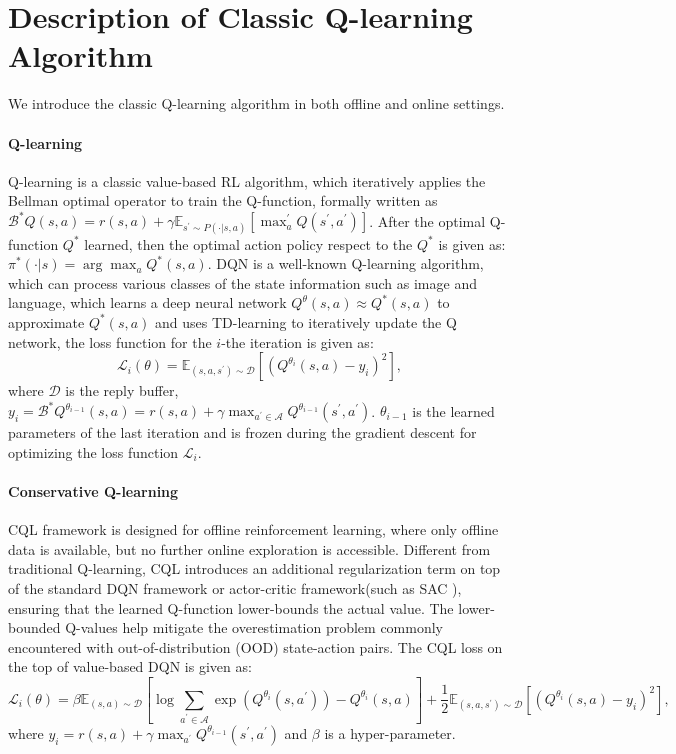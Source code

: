 \section{Description of Classic Q-learning Algorithm}
We introduce the classic Q-learning algorithm in both offline and online settings.
\paragraph{Q-learning}
Q-learning is a classic value-based RL algorithm, which iteratively applies the Bellman optimal operator to train the Q-function, formally written as $\mathcal{B}^*Q(s,a)=r(s,a)+\gamma \mathbb{E}_{s^\prime\sim P(\cdot|s,a)}\left[\max_a^\prime Q(s^\prime,a^\prime)\right]$. After the optimal Q-function $Q^*$ learned, then the optimal action policy respect to the $Q^*$ is given as: $\pi^*(\cdot|s)=\arg\max_a Q^*(s,a)$. DQN \citep{mnih2013playing} is a well-known Q-learning algorithm, which can process various classes of the state information such as image and language, which learns a deep neural network $Q^\theta(s,a)\approx Q^*(s,a)$ to approximate $Q^*(s,a)$ and uses TD-learning to iteratively update the Q network, the loss function for the $i$-the iteration is given as: 
\begin{equation}
\mathcal{L}_i(\theta)=\mathbb{E}_{(s,a,s^\prime)\sim \mathcal{D}}\left[(Q^{\theta_i}(s,a)-y_i)^2\right],
\end{equation}
where $\mathcal{D}$ is the reply buffer, $y_i=\mathcal{B}^*Q^{\theta_{i-1}}(s,a)=r(s,a)+\gamma \max_{a^\prime\in \mathcal{A}} Q^{\theta_{i-1}}(s^\prime,a^\prime)$. $\theta_{i-1}$ is the learned parameters of the last iteration and is frozen during the gradient descent for optimizing the loss function $\mathcal{L}_i$.
\paragraph{Conservative Q-learning}
CQL \citep{kumar2020conservative} framework is designed for offline reinforcement learning, where only offline data is available, but no further online exploration is accessible. Different from traditional Q-learning, CQL introduces an additional regularization term on top of the standard DQN framework or actor-critic framework(such as SAC \citep{haarnoja2018soft}), ensuring that the learned Q-function lower-bounds the actual value. The lower-bounded Q-values help mitigate the overestimation problem commonly encountered with out-of-distribution (OOD) state-action pairs. The CQL loss on the top of value-based DQN is given as:
\begin{equation}
\mathcal{L}_i(\theta)=\beta\mathbb{E}_{(s,a)\sim \mathcal{D}}\left[\log \sum_{a^\prime\in \mathcal{A}} \exp(Q^{\theta_i}(s,a^\prime))-Q^{\theta_i}(s,a)\right]+\frac{1}{2}\mathbb{E}_{(s,a,s^\prime)\sim \mathcal{D}} \left[(Q^{\theta_i}(s,a)-y_i)^2\right],
\end{equation}
where $y_i=r(s,a)+\gamma \max_{a^\prime} Q^{\theta_{i-1}}(s^\prime,a^\prime)$ and $\beta$ is a hyper-parameter.


